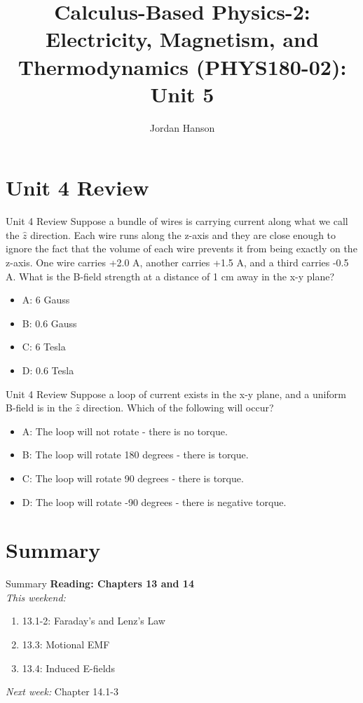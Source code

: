 \documentclass{beamer}
\title{Calculus-Based Physics-2: Electricity, Magnetism, and Thermodynamics (PHYS180-02): Unit 5}
\author{Jordan Hanson}
\institute{Whittier College Department of Physics and Astronomy}
\begin{document}
\maketitle

\section{Unit 4 Review}

\begin{frame}{Unit 4 Review}
Suppose a bundle of wires is carrying current along what we call the $\hat{z}$ direction.  Each wire runs along the z-axis and they are close enough to ignore the fact that the volume of each wire prevents it from being exactly on the z-axis.  One wire carries +2.0 A, another carries +1.5 A, and a third carries -0.5 A.  What is the B-field strength at a distance of 1 cm away in the x-y plane?
\begin{itemize}
\item A: 6 Gauss
\item B: 0.6 Gauss
\item C: 6 Tesla
\item D: 0.6 Tesla
\end{itemize}
\end{frame}

\begin{frame}{Unit 4 Review}
Suppose a loop of current exists in the x-y plane, and a uniform B-field is in the $\hat{z}$ direction.  Which of the following will occur?
\begin{itemize}
\item A: The loop will not rotate - there is no torque.
\item B: The loop will rotate 180 degrees - there is torque.
\item C: The loop will rotate 90 degrees - there is torque.
\item D: The loop will rotate -90 degrees - there is negative torque.
\end{itemize}
\end{frame}

\section{Summary}

\begin{frame}{Summary}
\textbf{Reading: Chapters 13 and 14} \\ \vspace{0.5cm}
\textit{This weekend:}
\begin{enumerate}
\item 13.1-2: Faraday's and Lenz's Law
\item 13.3: Motional EMF
\item 13.4: Induced E-fields
\end{enumerate}
\textit{Next week:} Chapter 14.1-3
\end{frame}
\end{document}
